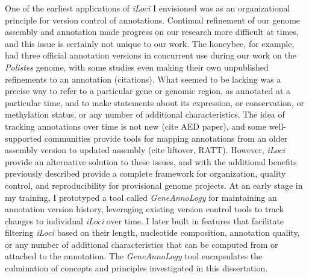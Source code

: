 One of the earliest applications of \textit{iLoci} I envisioned was as an organizational principle for version control of annotations.
Continual refinement of our genome assembly and annotation made progress on our research more difficult at times, and this issue is certainly not unique to our work.
The honeybee, for example, had three official annotation versions in concurrent use during our work on the \textit{Polistes} genome, with some studies even making their own unpublished refinements to an annotation (citations).
What seemed to be lacking was a precise way to refer to a particular gene or genomic region, as annotated at a particular time, and to make statements about its expression, or conservation, or methylation status, or any number of additional characteristics.
The idea of tracking annotations over time is not new (cite AED paper), and some well-supported communities provide tools for mapping annotations from an older assembly version to updated assembly (cite liftover, RATT).
However, \textit{iLoci} provide an alternative solution to these issues, and with the additional benefits previously described provide a complete framework for organization, quality control, and reproducibility for provisional genome projects.
At an early stage in my training, I prototyped a tool called \textit{GeneAnnoLogy} for maintaining an annotation version history, leveraging existing version control tools to track changes to individual \textit{iLoci} over time.
I later built in features that facilitate filtering \textit{iLoci} based on their length, nucleotide composition, annotation quality, or any number of additional characteristics that can be computed from or attached to the annotation.
The \textit{GeneAnnoLogy} tool encapsulates the culmination of concepts and principles investigated in this dissertation.
